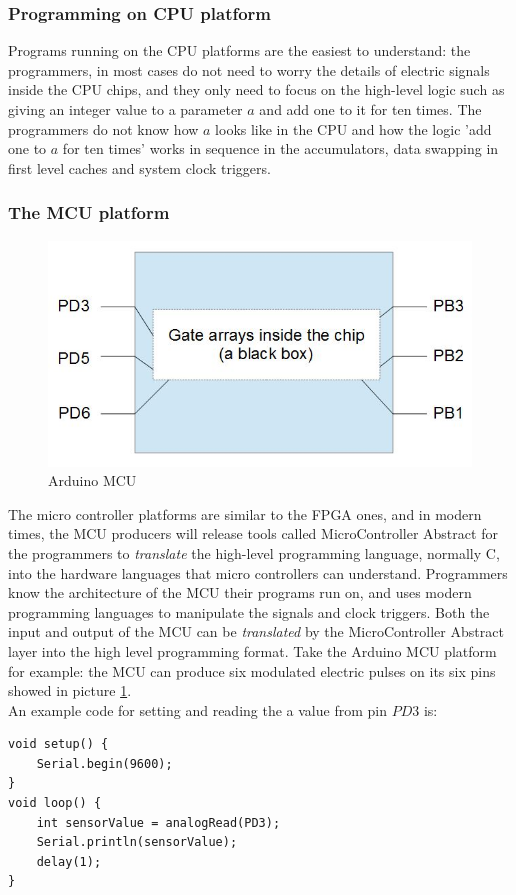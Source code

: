 \documentclass[11pt,openright,a4paper]{report}
\begin{document}
\subsubsection{Programming on CPU platform}
Programs running on the CPU platforms are the easiest to understand: the programmers, in most cases do not need to worry the details of electric signals inside the CPU chips, and they only need to focus on the high-level logic such as giving an integer value to a parameter $a$ and add one to it for ten times. The programmers do not know how $a$ looks like in the CPU and how the logic 'add one to $a$ for ten times' works in sequence in the accumulators, data swapping in first level caches and system clock triggers. \\
\subsubsection{The MCU platform}
\begin{figure}
\centering
\includegraphics[width=0.6\linewidth]{picture/mcu}
\caption{Arduino MCU}
\label{fig:mcu}
\end{figure}
The micro controller platforms are similar to the FPGA ones, and in modern times, the MCU producers will release tools called MicroController Abstract for the programmers to \textit{translate} the high-level programming language, normally C, into the hardware languages that micro controllers can understand. Programmers know the architecture of the MCU their programs run on, and uses modern programming languages to manipulate the signals and clock triggers. Both the input and output of the MCU can be \textit{translated} by the MicroController Abstract layer into the high level programming format. Take the Arduino MCU platform for example: the MCU can produce six modulated electric pulses on its six pins showed in picture \ref{fig:mcu}.\\
An example code for setting and reading the a value from pin $PD3$ is:
\begin{lstlisting}[breaklines,breakatwhitespace,caption={Reading PD3 from Arduino MCU},label=compression-psudoCode]
void setup() {
	Serial.begin(9600);
}
void loop() {
	int sensorValue = analogRead(PD3);
	Serial.println(sensorValue);
	delay(1);
}
\end{lstlisting}
\end{document}
